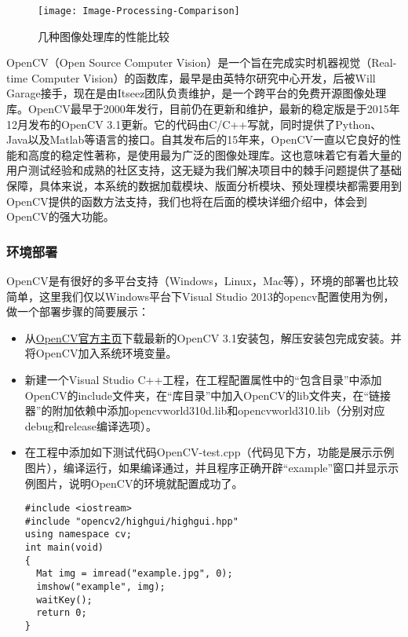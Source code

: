 \begin{figure}
	\centering
	\texttt{[image: Image-Processing-Comparison]}
	\caption{几种图像处理库的性能比较}
	\label{pic:image-processing-comparison}
\end{figure}

OpenCV（Open Source Computer Vision）是一个旨在完成实时机器视觉（Real-time Computer Vision）的函数库，最早是由英特尔研究中心开发，后被Will Garage接手，现在是由Itseez团队负责维护，是一个跨平台的免费开源图像处理库\citep{wiki:OpenCV}。OpenCV最早于2000年发行，目前仍在更新和维护，最新的稳定版是于2015年12月发布的OpenCV 3.1更新。它的代码由C/C++写就，同时提供了Python、Java以及Matlab等语言的接口\citep{wiki:OpenCV}。自其发布后的15年来，OpenCV一直以它良好的性能和高度的稳定性著称，是使用最为广泛的图像处理库。这也意味着它有着大量的用户测试经验和成熟的社区支持，这无疑为我们解决项目中的棘手问题提供了基础保障，具体来说，本系统的数据加载模块、版面分析模块、预处理模块都需要用到OpenCV提供的函数方法支持，我们也将在后面的模块详细介绍中，体会到OpenCV的强大功能。

\subsubsection*{环境部署}
OpenCV是有很好的多平台支持（Windows，Linux，Mac等），环境的部署也比较简单，这里我们仅以Windows平台下Visual Studio 2013的opencv配置使用为例，做一个部署步骤的简要展示：
\begin{itemize}
  \item 从\href{http://opencv.org/}{OpenCV官方主页}下载最新的OpenCV 3.1安装包，解压安装包完成安装。并将OpenCV加入系统环境变量。
  \item 新建一个Visual Studio C++工程，在工程配置属性中的“包含目录”中添加OpenCV的include文件夹，在“库目录”中加入OpenCV的lib文件夹，在“链接器”的附加依赖中添加opencvworld310d.lib和opencvworld310.lib（分别对应debug和release编译选项）。
  \item 在工程中添加如下测试代码OpenCV-test.cpp（代码见下方，功能是展示示例图片），编译运行，如果编译通过，并且程序正确开辟“example”窗口并显示示例图片，说明OpenCV的环境就配置成功了。
\begin{lstlisting}[label=OpenCV-test.cpp]
#include <iostream>
#include "opencv2/highgui/highgui.hpp"
using namespace cv;
int main(void)
{
  Mat img = imread("example.jpg", 0);
  imshow("example", img);
  waitKey();
  return 0;
}
\end{lstlisting}
\end{itemize}



